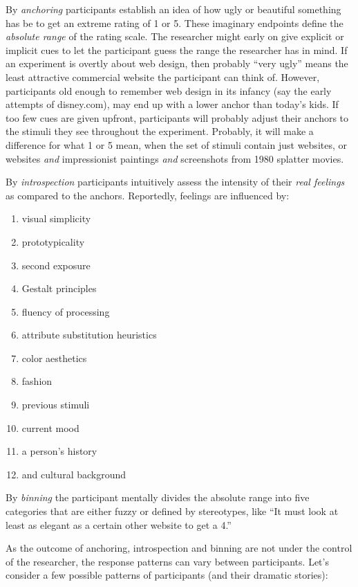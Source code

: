 \documentclass[]{svmono}
\providecommand{\tightlist}{%
  \setlength{\itemsep}{0pt}\setlength{\parskip}{0pt}}
\begin{document}
By \emph{anchoring} participants establish an idea of how ugly or
beautiful something has be to get an extreme rating of 1 or 5. These
imaginary endpoints define the \emph{absolute range} of the rating
scale. The researcher might early on give explicit or implicit cues to
let the participant guess the range the researcher has in mind. If an
experiment is overtly about web design, then probably ``very ugly''
means the least attractive commercial website the participant can think
of. However, participants old enough to remember web design in its
infancy (say the early attempts of disney.com), may end up with a lower
anchor than today's kids. If too few cues are given upfront,
participants will probably adjust their anchors to the stimuli they see
throughout the experiment. Probably, it will make a difference for what
1 or 5 mean, when the set of stimuli contain just websites, or websites
\emph{and} impressionist paintings \emph{and} screenshots from 1980
splatter movies.

By \emph{introspection} participants intuitively assess the intensity of
their \emph{real feelings} as compared to the anchors. Reportedly,
feelings are influenced by:

\begin{enumerate}
\def\labelenumi{\arabic{enumi}.}
\tightlist
\item
  visual simplicity
\item
  prototypicality
\item
  second exposure
\item
  Gestalt principles
\item
  fluency of processing
\item
  attribute substitution heuristics
\item
  color aesthetics
\item
  fashion
\item
  previous stimuli
\item
  current mood
\item
  a person's history
\item
  and cultural background 
\end{enumerate}

By \emph{binning} the participant mentally divides the absolute range
into five categories that are either fuzzy or defined by stereotypes,
like ``It must look at least as elegant as a certain other website to
get a 4.''

As the outcome of anchoring, introspection and binning are not under the
control of the researcher, the response patterns can vary between
participants. Let's consider a few possible patterns of participants
(and their dramatic stories):
\end{document}
